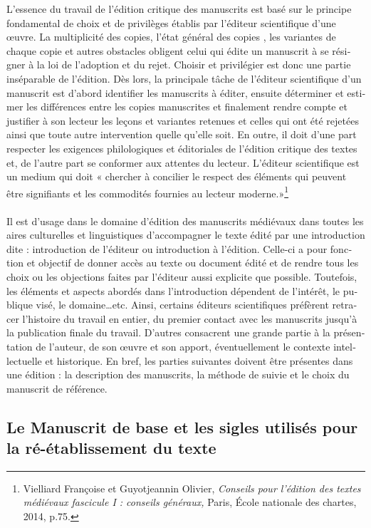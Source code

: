 \documentclass[a4paper,12pt]{report}
\begin{document}
\begin{itemize}
\begin{enumerate}
\begin{french}
L’essence du travail de l’édition critique des manuscrits est basé sur le principe fondamental de choix et de privilèges établis par l’éditeur scientifique d’une œuvre. La multiplicité des copies, l'état général des copies , les variantes de chaque copie et autres obstacles obligent celui qui édite un manuscrit à se résigner à la loi  de l’adoption et du rejet.  Choisir et privilégier est donc une partie inséparable de l’édition. Dès lors, la principale tâche de l’éditeur scientifique d’un manuscrit est d'abord identifier les manuscrits à éditer, ensuite déterminer et estimer les différences entre les copies manuscrites et finalement rendre compte et  justifier à son lecteur les leçons et variantes retenues et celles qui ont été  rejetées  ainsi que  toute autre intervention  quelle qu’elle soit. En outre, il doit d’une part respecter  les exigences philologiques et éditoriales  de l’édition critique des textes et, de l’autre part se conformer aux  attentes du lecteur. L’éditeur scientifique est un medium qui doit « chercher à concilier le respect des éléments qui peuvent être signifiants et les commodités fournies au lecteur moderne.»\footnote{Vielliard Françoise et Guyotjeannin Olivier, \textit{Conseils pour l’édition des textes médiévaux fascicule I : conseils généraux,} Paris, École nationale des chartes, 2014, p.75. }
\paragraph{}
Il est d’usage dans le domaine d’édition des manuscrits médiévaux dans toutes les aires culturelles et linguistiques d’accompagner le texte édité par une introduction  dite :  introduction de l’éditeur ou introduction à l’édition. Celle-ci a pour fonction et objectif de donner accès au texte ou document édité et de rendre tous les choix ou les objections faites par l’éditeur aussi explicite que possible. Toutefois, les éléments et aspects abordés dans l’introduction  dépendent de l’intérêt, le publique visé, le domaine…etc. Ainsi, certains  éditeurs scientifiques préfèrent retracer l’histoire du travail en entier, du premier contact avec les manuscrits jusqu’à la publication finale du travail. D’autres  consacrent une grande partie à la présentation de l’auteur, de  son œuvre et son apport, éventuellement le contexte intellectuelle et historique. En bref,  les parties suivantes doivent être présentes dans une édition : la description des manuscrits, la méthode de suivie et le choix du manuscrit de référence.

\newpage
\subsection{Le Manuscrit de base et les sigles utilisés pour la ré-établissement du texte}



\end{french}
\end{enumerate}
\end{itemize}
\end{document}
